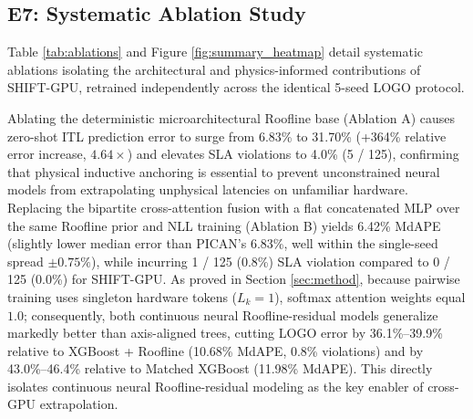\documentclass[preprint,12pt]{elsarticle}
\begin{document}
\subsection{E7: Systematic Ablation Study}
Table \ref{tab:ablations} and Figure \ref{fig:summary_heatmap} detail systematic ablations isolating the architectural and physics-informed contributions of SHIFT-GPU, retrained independently across the identical 5-seed LOGO protocol.

\begin{table}[h]
\centering
\caption{Systematic ablation study isolating architectural and algorithmic components of SHIFT-GPU. All neural variants trained with the identical 5-seed Gaussian NLL protocol across the 8 LOGO folds.}
\label{tab:ablations}
\end{table}

Ablating the deterministic microarchitectural Roofline base (Ablation A) causes zero-shot ITL prediction error to surge from 6.83\% to 31.70\% (+364\% relative error increase, $4.64\times$) and elevates SLA violations to 4.0\% (5 / 125), confirming that physical inductive anchoring is essential to prevent unconstrained neural models from extrapolating unphysical latencies on unfamiliar hardware. Replacing the bipartite cross-attention fusion with a flat concatenated MLP over the same Roofline prior and NLL training (Ablation B) yields 6.42\% MdAPE (slightly lower median error than PICAN's 6.83\%, well within the single-seed spread $\pm 0.75\%$), while incurring 1 / 125 (0.8\%) SLA violation compared to 0 / 125 (0.0\%) for SHIFT-GPU. As proved in Section \ref{sec:method}, because pairwise training uses singleton hardware tokens ($L_k = 1$), softmax attention weights equal $1.0$; consequently, both continuous neural Roofline-residual models generalize markedly better than axis-aligned trees, cutting LOGO error by 36.1\%--39.9\% relative to XGBoost + Roofline (10.68\% MdAPE, 0.8\% violations) and by 43.0\%--46.4\% relative to Matched XGBoost (11.98\% MdAPE). This directly isolates continuous neural Roofline-residual modeling as the key enabler of cross-GPU extrapolation.
\end{document}
